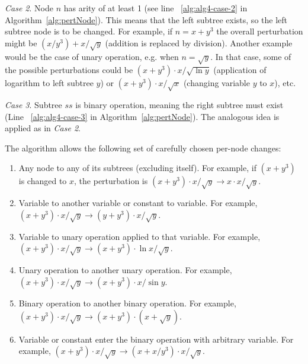 \documentclass[a4paper,12pt]{elsarticle}
\begin{document}
\emph{Case 2}. 
Node $n$ has arity of at least 1 (see line ~\ref{alg:alg4-case-2} in Algorithm~\ref{alg:pertNode}). This means that the left subtree exists, so the left subtree node is to be changed. 
For example, if $n=x+y^3$ the overall perturbation might be $(x/y^3)+x/\sqrt{y}$ (addition is replaced by division). 
Another example would be the case of unary operation, e.g. when $n=\sqrt{y}$. In that case, some of the possible perturbations could be $(x+y^3)\cdot x/\sqrt{\ln{y}}$ (application of logarithm to left subtree $y$) or $(x+y^3)\cdot x/\sqrt{x}$ (changing variable $y$ to $x$), etc.

\emph{Case 3}. 
Subtree $ss$ is binary operation, meaning the right subtree must exist (Line ~\ref{alg:alg4-case-3} in Algorithm~\ref{alg:pertNode}). 
The analogous idea is applied as in \emph{Case 2}. 

The algorithm allows the following set of carefully chosen per-node changes:

\begin{enumerate}
	\item Any node to any of its subtrees (excluding itself). For example, if $(x+y^3)$ is changed to $x$, the perturbation is $(x+y^3)\cdot x/\sqrt{y} \rightarrow x\cdot x/\sqrt{y}$. 
	\item Variable to another variable or constant to variable. For example,  $(x+y^3)\cdot x/\sqrt{y} \rightarrow (y+y^3)\cdot x/\sqrt{y}$.
	\item Variable to unary operation applied to that variable. For example,  $(x+y^3)\cdot x/\sqrt{y} \rightarrow (x+y^3)\cdot \ln{x}/\sqrt{y}$.
	\item Unary operation to another unary operation. For example,  $(x+y^3)\cdot x/\sqrt{y} \rightarrow (x+y^3)\cdot x/\sin{y}$.
	\item Binary operation to another binary operation. For example,  $(x+y^3)\cdot x/\sqrt{y} \rightarrow (x+y^3)\cdot (x + \sqrt{y})$. 
	\item Variable or constant enter the binary operation with arbitrary variable. For example,  $(x+y^3)\cdot x/\sqrt{y} \rightarrow (x+x/y^3)\cdot x/\sqrt{y}$. 
\end{enumerate} 


\end{document}
